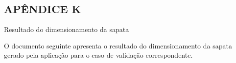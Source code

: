

\newpage
{}
\begin{center}
\section*{APÊNDICE K}
Resultado do dimensionamento da sapata
\end{center}

O documento seguinte apresenta o resultado do dimensionamento da sapata gerado pela aplicação para o caso de validação correspondente.

